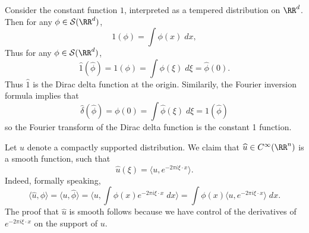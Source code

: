 \begin{example}
    Consider the constant function $1$, interpreted as a tempered distribution on $\RR^d$. Then for any $\phi \in \mathcal{S}(\RR^d)$,
    \[ 1(\phi) = \int \phi(x)\; dx, \]
    Thus for any $\phi \in \mathcal{S}(\RR^d)$,
    \[ \widehat{1} \left( \widehat{\phi} \right) = 1(\phi) = \int \phi(\xi)\; d\xi = \widehat{\phi}(0). \]
    Thus $\widehat{1}$ is the Dirac delta function at the origin. Similarily, the Fourier inversion formula implies that
    \[ \widehat{\delta} \left( \widehat{\phi} \right) = \phi(0) = \int \widehat{\phi}(\xi)\; d\xi = 1 \left( \widehat{\phi} \right) \]
    so the Fourier transform of the Dirac delta function is the constant 1 function.
\end{example}

\begin{example}
    Let $u$ denote a compactly supported distribution. We claim that $\widehat{u} \in C^\infty(\RR^n)$ is a smooth function, such that
    \[ \widehat{u}(\xi) = \langle u, e^{-2 \pi i \xi \cdot x} \rangle. \]
    Indeed, formally speaking,
    \[ \langle \widehat{u}, \phi \rangle = \langle u, \widehat{\phi} \rangle = \langle u, \int \phi(x) e^{-2 \pi i \xi \cdot x}\; dx \rangle = \int \phi(x) \langle u, e^{-2 \pi i \xi \cdot x} \rangle\; dx. \]
    The proof that $\widehat{u}$ is smooth follows because we have control of the derivatives of $e^{-2 \pi i \xi \cdot x}$ on the support of $u$. 
\end{example}

